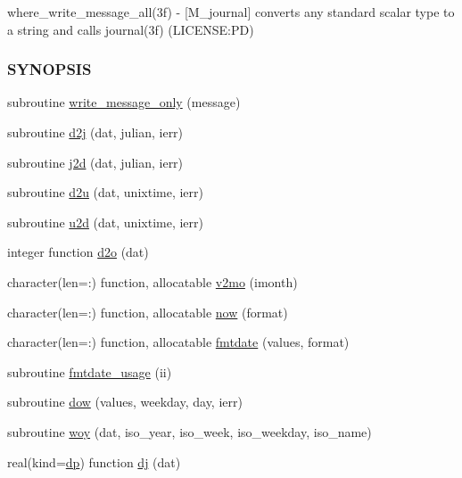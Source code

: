 \begin{DoxyCompactItemize}
\begin{DoxyCompactList}
where\+\_\+write\+\_\+message\+\_\+all(3f) -\/ \mbox{[}M\+\_\+journal\mbox{]} converts any standard scalar type to a string and calls journal(3f) (L\+I\+C\+E\+N\+SE\+:PD) \subsubsection*{S\+Y\+N\+O\+P\+S\+IS}\end{DoxyCompactList}\item 
subroutine \mbox{\hyperlink{namespacem__journal_aa86511a7c388f9286c282f6fa933ab58}{write\+\_\+message\+\_\+only}} (message)
\item 
subroutine \mbox{\hyperlink{namespacem__journal_a3978099ba1a861a6a67260c3060fc672}{d2j}} (dat, julian, ierr)
\item 
subroutine \mbox{\hyperlink{namespacem__journal_a3856fe36ea3b9de491627294a1488918}{j2d}} (dat, julian, ierr)
\item 
subroutine \mbox{\hyperlink{namespacem__journal_a9cd7f892071e8ddfde7e45fea077c3ce}{d2u}} (dat, unixtime, ierr)
\item 
subroutine \mbox{\hyperlink{namespacem__journal_a9521857f9c0a6ef8c85edcf9a3af1b07}{u2d}} (dat, unixtime, ierr)
\item 
integer function \mbox{\hyperlink{namespacem__journal_ac12ae324e8c89f7400fb9ef0a581dc00}{d2o}} (dat)
\item 
character(len=\+:) function, allocatable \mbox{\hyperlink{namespacem__journal_a1941b83a2253bc58165639f256827534}{v2mo}} (imonth)
\item 
character(len=\+:) function, allocatable \mbox{\hyperlink{namespacem__journal_a4a421ecf44cfb86feeee17c7505d7b98}{now}} (format)
\item 
character(len=\+:) function, allocatable \mbox{\hyperlink{namespacem__journal_a626580cd351557ac2d107fd2a97a388f}{fmtdate}} (values, format)
\item 
subroutine \mbox{\hyperlink{namespacem__journal_aad40dcd3091bc958ddd427db862e28b5}{fmtdate\+\_\+usage}} (ii)
\item 
subroutine \mbox{\hyperlink{namespacem__journal_a40b5e01c631024472f21521c9705881a}{dow}} (values, weekday, day, ierr)
\item 
subroutine \mbox{\hyperlink{namespacem__journal_a1ee1cbb181ac428b54cd9e7acaba3be9}{woy}} (dat, iso\+\_\+year, iso\+\_\+week, iso\+\_\+weekday, iso\+\_\+name)
\item 
real(kind=\mbox{\hyperlink{namespacem__journal_aaae0522a70bb76a85ea800670d5fec5f}{dp}}) function \mbox{\hyperlink{namespacem__journal_a649265e689819cb284a82eb80c49df49}{dj}} (dat)

\end{DoxyCompactItemize}
